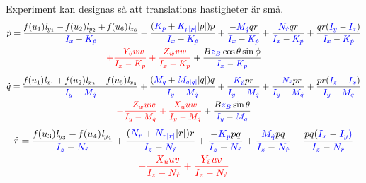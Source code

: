 \documentclass[11pt,aspectratio=169]{beamer}
\begin{document}
\begin{frame}[shrink]
Experiment kan designas så att translations hastigheter är små.
\begin{multline*}
\dot{p} = \frac{\mathit{f}(u_{1}) \mathit{l}_{y_{1}} - \mathit{f}(u_{2}) \mathit{l}_{y_{2}} + \mathit{f}(u_{6}) \mathit{l}_{z_{6}}}{{\color{blue}I_{x}} - {\color{blue}K_{\dot{p}}}} + \frac{ ({\color{blue}K_{p}} + {\color{blue}K_{p|p|}} |p|)p}{{\color{blue}I_{x}} - {\color{blue}K_{\dot{p}}}}  + \frac{-{\color{blue}M_{\dot{q}}} q r}{{\color{blue}I_{x}} - {\color{blue}K_{\dot{p}}}} +  \frac{{\color{blue}N_{\dot{r}}} q r}{{\color{blue}I_{x}} - {\color{blue}K_{\dot{p}}}}  + \frac{q r ({\color{blue}I_{y}} - {\color{blue}I_{z}})}{{\color{blue}I_{x}} - {\color{blue}K_{\dot{p}}}} \\{\color{red} + \frac{- Y_{\dot{v}} v w}{I_{x} - K_{\dot{p}}} + \frac{Z_{\dot{w}} v w}{I_{x} - K_{\dot{p}}}} + \frac{B {\color{blue}z_B} \cos{\theta} \sin{\phi}}{{\color{blue}I_{x}} - {\color{blue}K_{\dot{p}}}}
\end{multline*}
\begin{multline*}
\dot{q} =\frac{\mathit{f}(u_{1}) \mathit{l}_{x_{1}} + \mathit{f}(u_{2}) \mathit{l}_{x_{2}} - \mathit{f}(u_{5}) \mathit{l}_{x_{5}}}{{\color{blue}I_{y}} - {\color{blue}M_{\dot{q}}}} + \frac{({\color{blue}M_{q}} + {\color{blue}M_{q|q|}} |q|)q}{{\color{blue}{\ensuremath{I_{y}}}} - {\color{blue}M_{\dot{q}}}} + \frac{{\color{blue}K_{\dot{p}}} p r}{{\color{blue}I_{y}} - {\color{blue}M_{\dot{q}}}} + \frac{-{\color{blue}N_{\dot{r}}} p r}{{\color{blue}I_{y}} - {\color{blue}M_{\dot{q}}}}  +
\frac{p r ({\color{blue}I_{z}} - {\color{blue}I_{x}})}{{\color{blue}I_{y}} - {\color{blue}M_{\dot{q}}}} \\ {\color{red} + \frac{-Z_{\dot{w}} u w}{I_{y} - M_{\dot{q}}} + \frac{X_{\dot{u}} u w}{I_{y} - M_{\dot{q}}}} + \frac{B {\color{blue}z_B} \sin{\theta} }{{\color{blue}I_{y}} - {\color{blue}M_{\dot{q}}}} 
\end{multline*}
\begin{multline*}
\dot{r} = \frac{\mathit{f}(u_{3}) \mathit{l}_{y_{3}} - \mathit{f}(u_{4}) \mathit{l}_{y_{4}}}{{\color{blue}I_{z}} - {\color{blue}N_{\dot{r}}}} + \frac{({\color{blue}N_{r}} + {\color{blue}N_{r|r|}} |r|)r}{{\color{blue}I_{z}} - {\color{blue}N_{\dot{r}}}} + \frac{-{\color{blue}K_{\dot{p}}} p q}{{\color{blue}I_{z}} - {\color{blue}N_{\dot{r}}}} + \frac{{\color{blue}M_{\dot{q}}} p q}{{\color{blue}I_{z}} - {\color{blue}N_{\dot{r}}}} + \frac{p q ({\color{blue}I_{x}} - {\color{blue}I_{y})}}{{\color{blue}I_{z}} - {\color{blue}N_{\dot{r}}}}\\ {\color{red} + \frac{- X_{\dot{u}} u v}{I_{z} - N_{\dot{r}}} + \frac{Y_{\dot{v}} u v}{I_{z} - N_{\dot{r}}}}
\end{multline*}

\end{frame}
\end{document}
